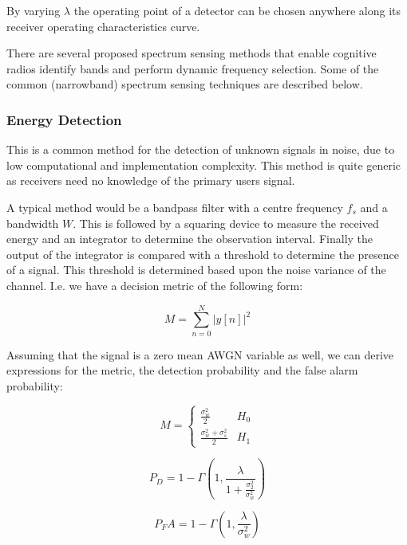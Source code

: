 By varying \(\lambda\) the operating point of a detector can be chosen anywhere along its receiver operating characteristics curve.

There are several proposed spectrum sensing methods that enable cognitive radios identify bands and perform dynamic frequency selection. Some of the common (narrowband) spectrum sensing techniques are described below.

\subsubsection{Energy Detection}
This is a common method for the detection of unknown signals in noise, due to low computational and implementation complexity. This method is quite generic as receivers need no knowledge of the primary users signal. 

A typical method would be a bandpass filter with a centre frequency \(f_{s}\) and a bandwidth \(W\). This is followed by a squaring device to measure the received energy and an integrator to determine the observation interval. Finally the output of the integrator is compared with a threshold to determine the presence of a signal. This threshold is determined based upon the noise variance of the channel. I.e. we have a decision metric of the following form:

\begin{equation}
M = \sum_{n=0}^N |y\left[n\right]|^2
\end{equation}

Assuming that the signal is a zero mean AWGN variable as well, we can derive expressions for the metric, the detection probability and the false alarm probability:

\begin{equation}
 M =
  \begin{cases}
   \frac{\sigma_w^2}{2} & H_0 \\
   \frac{\sigma_w^2 + \sigma_s^2}{2} & H_1
  \end{cases}
\end{equation}

\begin{equation}
P_D = 1 - \Gamma\left(1, \frac{\lambda}{1 + \frac{ \sigma_2^2 }{ \sigma_w^2 } } \right)
\end{equation}

\begin{equation}
P_FA = 1 - \Gamma\left(1, \frac{\lambda}{\sigma_w^2} \right)
\end{equation}

